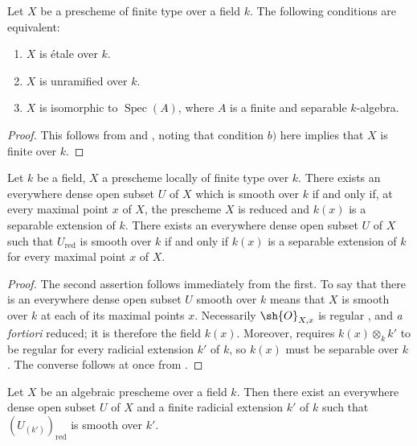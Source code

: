 \begin{proposition}[17.15.11]
\label{IV.17.15.11}
Let $X$ be a prescheme of finite type over a field $k$.
The following conditions are equivalent:
\begin{enumerate}
  \item[a)] $X$ is \'etale over $k$.
  \item[b)] $X$ is unramified over $k$.
  \item[c)] $X$ is isomorphic to $\operatorname{Spec}(A)$, where $A$ is a finite and separable $k$-algebra.
\end{enumerate}
\end{proposition}

\begin{proof}
This follows from  and , noting that condition $b)$ here implies that $X$ is finite over $k$.
\end{proof}

\begin{proposition}[17.15.12]
\label{IV.17.15.12}
Let $k$ be a field, $X$ a prescheme locally of finite type over $k$.
There exists an everywhere dense open subset $U$ of $X$ which is smooth over $k$ if and only if, at every maximal point $x$ of $X$, the prescheme $X$ is reduced and $k(x)$ is a separable extension of $k$.
There exists an everywhere dense open subset $U$ of $X$ such that $U_{\mathrm{red}}$ is smooth over $k$ if and only if $k(x)$ is a separable extension of $k$ for every maximal point $x$ of $X$.
\end{proposition}

\begin{proof}
The second assertion follows immediately from the first.  To say that there is an everywhere dense open subset $U$ smooth over $k$ means that $X$ is smooth over $k$ at each of its maximal points $x$.  Necessarily $\sh{O}_{X,x}$ is regular , and \emph{a fortiori} reduced; it is therefore the field $k(x)$.  Moreover,  requires $k(x)\otimes_k k'$ to be regular for every radicial extension $k'$ of $k$, so $k(x)$ must be separable over $k$ .  The converse follows at once from .
\end{proof}

\begin{corollary}[17.15.13]
\label{IV.17.15.13}
Let $X$ be an algebraic prescheme over a field $k$.
Then there exist an everywhere dense open subset $U$ of $X$ and a finite radicial extension $k'$ of $k$ such that $(U_{(k')})_{\mathrm{red}}$ is smooth over $k'$.
\end{corollary}

